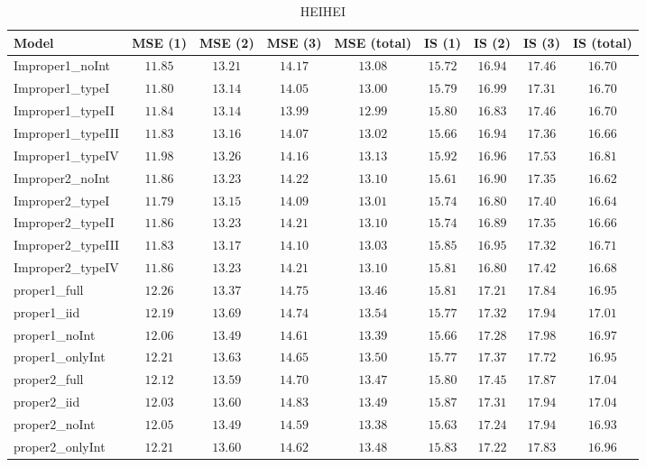 \begin{table}

\caption{\label{tab:model-choice-sc3}HEIHEI}
\centering
\begin{tabular}{lcccccccc}
\hline
Model  & MSE (1) & MSE (2) & MSE (3) & MSE (total) & IS (1) & IS (2) & IS (3) & \multicolumn{1}{c}{IS (total)} \\ 
\hline
Improper1_noInt  & $11.85$ & $13.21$ & $14.17$ & $13.08$ & $15.72$ & $16.94$ & $17.46$ & $16.70$ \\
Improper1_typeI  & $11.80$ & $13.14$ & $14.05$ & $13.00$ & $15.79$ & $16.99$ & $17.31$ & $16.70$ \\
Improper1_typeII  & $11.84$ & $13.14$ & $13.99$ & $12.99$ & $15.80$ & $16.83$ & $17.46$ & $16.70$ \\
Improper1_typeIII  & $11.83$ & $13.16$ & $14.07$ & $13.02$ & $15.66$ & $16.94$ & $17.36$ & $16.66$ \\
Improper1_typeIV  & $11.98$ & $13.26$ & $14.16$ & $13.13$ & $15.92$ & $16.96$ & $17.53$ & $16.81$ \\
Improper2_noInt  & $11.86$ & $13.23$ & $14.22$ & $13.10$ & $15.61$ & $16.90$ & $17.35$ & $16.62$ \\
Improper2_typeI  & $11.79$ & $13.15$ & $14.09$ & $13.01$ & $15.74$ & $16.80$ & $17.40$ & $16.64$ \\
Improper2_typeII  & $11.86$ & $13.23$ & $14.21$ & $13.10$ & $15.74$ & $16.89$ & $17.35$ & $16.66$ \\
Improper2_typeIII  & $11.83$ & $13.17$ & $14.10$ & $13.03$ & $15.85$ & $16.95$ & $17.32$ & $16.71$ \\
Improper2_typeIV  & $11.86$ & $13.23$ & $14.21$ & $13.10$ & $15.81$ & $16.80$ & $17.42$ & $16.68$ \\
proper1_full  & $12.26$ & $13.37$ & $14.75$ & $13.46$ & $15.81$ & $17.21$ & $17.84$ & $16.95$ \\
proper1_iid  & $12.19$ & $13.69$ & $14.74$ & $13.54$ & $15.77$ & $17.32$ & $17.94$ & $17.01$ \\
proper1_noInt  & $12.06$ & $13.49$ & $14.61$ & $13.39$ & $15.66$ & $17.28$ & $17.98$ & $16.97$ \\
proper1_onlyInt  & $12.21$ & $13.63$ & $14.65$ & $13.50$ & $15.77$ & $17.37$ & $17.72$ & $16.95$ \\
proper2_full  & $12.12$ & $13.59$ & $14.70$ & $13.47$ & $15.80$ & $17.45$ & $17.87$ & $17.04$ \\
proper2_iid  & $12.03$ & $13.60$ & $14.83$ & $13.49$ & $15.87$ & $17.31$ & $17.94$ & $17.04$ \\
proper2_noInt  & $12.05$ & $13.49$ & $14.59$ & $13.38$ & $15.63$ & $17.24$ & $17.94$ & $16.93$ \\
proper2_onlyInt  & $12.21$ & $13.60$ & $14.62$ & $13.48$ & $15.83$ & $17.22$ & $17.83$ & $16.96$ \\
\hline 
\end{tabular}

\end{table}